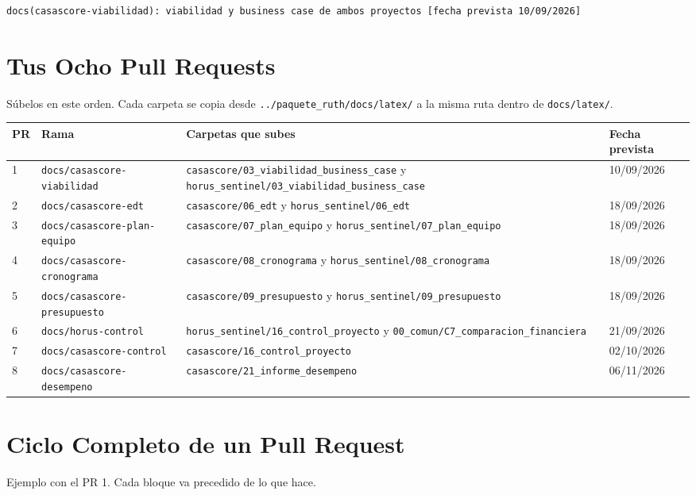 \documentclass[11pt,a4paper]{article}
\begin{document}
\begin{lstlisting}
docs(casascore-viabilidad): viabilidad y business case de ambos proyectos [fecha prevista 10/09/2026]
\end{lstlisting}

\section{Tus Ocho Pull Requests}
Súbelos en este orden. Cada carpeta se copia desde \nolinkurl{../paquete_ruth/docs/latex/} a la misma ruta dentro de \nolinkurl{docs/latex/}.

\vspace{0.1cm}
{\small
{}
\noindent\begin{tabularx}{\textwidth}{@{}C{0.6cm} P{4.05cm} L C{1.8cm}@{}}
\toprule
{}
\textbf{PR} & \textbf{Rama} & \textbf{Carpetas que subes} & \textbf{Fecha prevista} \\
 & \nolinkurl{docs/casascore-viabilidad} & \nolinkurl{casascore/03_viabilidad_business_case} y \nolinkurl{horus_sentinel/03_viabilidad_business_case} & 10/09/2026 \\
2 & \nolinkurl{docs/casascore-edt} & \nolinkurl{casascore/06_edt} y \nolinkurl{horus_sentinel/06_edt} & 18/09/2026 \\
3 & \nolinkurl{docs/casascore-plan-equipo} & \nolinkurl{casascore/07_plan_equipo} y \nolinkurl{horus_sentinel/07_plan_equipo} & 18/09/2026 \\
4 & \nolinkurl{docs/casascore-cronograma} & \nolinkurl{casascore/08_cronograma} y \nolinkurl{horus_sentinel/08_cronograma} & 18/09/2026 \\
5 & \nolinkurl{docs/casascore-presupuesto} & \nolinkurl{casascore/09_presupuesto} y \nolinkurl{horus_sentinel/09_presupuesto} & 18/09/2026 \\
6 & \nolinkurl{docs/horus-control} & \nolinkurl{horus_sentinel/16_control_proyecto} y \nolinkurl{00_comun/C7_comparacion_financiera} & 21/09/2026 \\
7 & \nolinkurl{docs/casascore-control} & \nolinkurl{casascore/16_control_proyecto} & 02/10/2026 \\
8 & \nolinkurl{docs/casascore-desempeno} & \nolinkurl{casascore/21_informe_desempeno} & 06/11/2026 \\
\bottomrule
\end{tabularx}
}

\section{Ciclo Completo de un Pull Request}
Ejemplo con el PR 1. Cada bloque va precedido de lo que hace.
\end{document}
